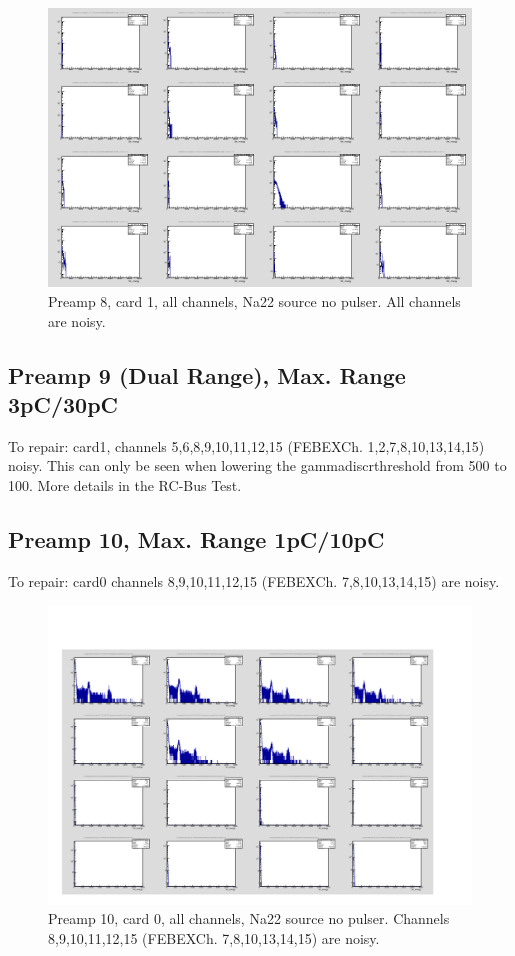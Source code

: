 \documentclass{report}
\begin{document}
\begin{figure}[!htb]
  \includegraphics[width=\linewidth]{dr_latest_test/preamp8_lim_energy_card1_all_no_pulser.png}
  \caption{Preamp 8, card 1, all channels, Na22 source  no pulser. All channels are noisy.}
\end{figure}
\newpage
\clearpage

\subsection{Preamp 9 (Dual Range), Max. Range 3pC/30pC}
To repair: card1, channels 5,6,8,9,10,11,12,15 (FEBEXCh. 1,2,7,8,10,13,14,15) noisy. This can only be seen when lowering the \dq gamma\textunderscore discr\textunderscore threshold\dq{} from 500 to 100. More details in the RC-Bus Test.
\newpage
\clearpage

\subsection{Preamp 10, Max. Range 1pC/10pC}
To repair: card0 channels 8,9,10,11,12,15 (FEBEXCh. 7,8,10,13,14,15) are noisy.
\begin{figure}[!htb]
  \includegraphics[width=\linewidth]{small_box_card0_all_nopulser.png}
  \caption{Preamp 10, card 0, all channels, Na22 source  no pulser. Channels 8,9,10,11,12,15 (FEBEXCh. 7,8,10,13,14,15) are noisy.}
\end{figure}
\end{document}
